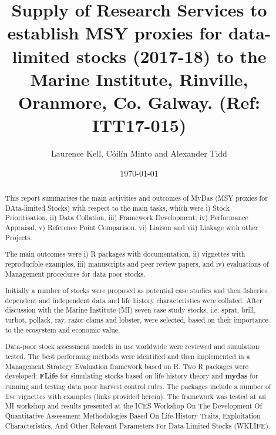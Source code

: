 \documentclass[a4paper, 10pt]{article}
\title{Supply of Research Services to establish MSY proxies for data-limited stocks (2017-18) to the Marine Institute, Rinville, Oranmore, Co. Galway.
(Ref: ITT17-015)}
\author{Laurence Kell, C\'oil\'in Minto and Alexander Tidd}
\date{\today}
\begin{document}


\onehalfspacing
{}
\rhead{}

\maketitle
\thispagestyle{fancy}
\pagestyle{empty}

%

\onehalfspacing
{}
\rhead{}

\maketitle
\thispagestyle{fancy}
\pagestyle{empty}

\maketitle

\begin{abstract}

This report summarises the main activities and outcomes of MyDas (MSY proxies for DAta-limited Stocks) with respect to the main tasks, which were i) Stock Prioritisation, ii) Data Collation, iii) Framework Development; iv) Performance Appraisal, v) Reference Point Comparison, vi) Liaison and vii) Linkage with other Projects.

The main outcomes were i) R packages with documentation, ii)  vignettes with reproducible examples, iii) manuscripts and peer review papers, and iv) evaluations of Management procedures for data poor stocks.

Initially a number of stocks were proposed as potential case studies and then fisheries dependent and independent data and life history characteristics were collated.  After discussion with the Marine Institute (MI) seven case study stocks, i.e. sprat, brill, turbot, pollack, ray, razor clams and lobster, were selected, based on their importance to the ecosystem and economic value.

Data-poor stock assessment models in use worldwide were reviewed and simulation tested. The best performing methods were identified and then implemented in a Management Strategy Evaluation framework based on R. Two R packages were developed: \textbf{FLife} for simulating stocks based on life history theory and \textbf{mydas} for running and testing data poor harvest control rules. The packages include a number of live vignettes with examples (links provided herein). The framework was tested at an MI workshop and results presented at the ICES Workshop On The Development Of Quantitative Assessment Methodologies Based On Life-History Traits, Exploitation Characteristics, And Other Relevant Parameters For Data-Limited Stocks (WKLIFE).

\end{abstract}
\end{document}
